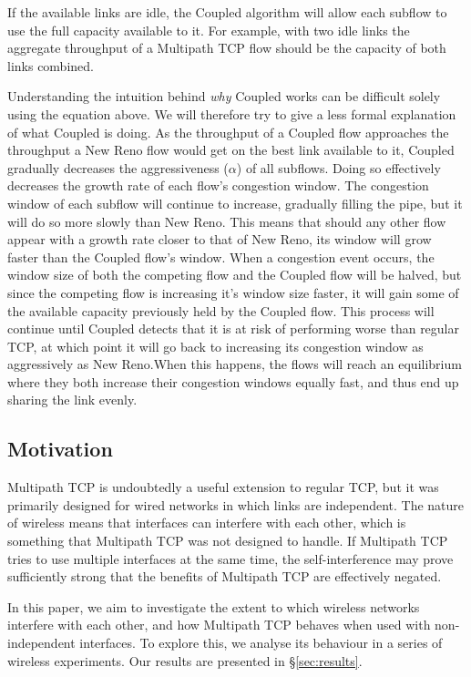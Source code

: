 If the available links are idle, the Coupled algorithm will allow each subflow to
use the full capacity available to it. For example, with two idle links the aggregate
throughput of a Multipath TCP flow should be the capacity of both links combined.

Understanding the intuition behind \textit{why} Coupled works can be difficult
solely using the equation above. We will therefore try to give a less formal
 explanation of what Coupled is doing. As the throughput of a Coupled
flow approaches the throughput a New Reno flow would get on the best link
available to it, Coupled gradually decreases the aggressiveness ($\alpha$)
of all subflows. Doing so effectively decreases the growth rate of each flow's
congestion window. The congestion window of each subflow will continue to increase,
gradually filling the pipe, but it will do so more slowly than New Reno. This means that
should any other flow appear with a growth rate closer to that of New Reno, its
window will grow faster than the Coupled flow's window. When a congestion event
occurs, the window size of both the competing flow and the Coupled
flow will be halved, but since the competing flow is increasing it's window size faster,
it will gain some of the available capacity previously held by the Coupled flow.
This process will continue until Coupled detects that it is at risk of
performing worse than regular TCP, at which point it will go back to increasing its
congestion window as aggressively as New Reno.\@ When this happens, the flows will
reach an equilibrium where they both increase their congestion windows equally
fast, and thus end up sharing the link evenly.

\subsection{Motivation}
\label{sec:bg:motivation}
Multipath TCP is undoubtedly a useful extension to regular TCP, but it was
primarily designed for wired networks in which links are independent.
The nature of wireless means that interfaces can interfere with each
other, which is something that Multipath TCP was not designed to handle.
If Multipath TCP
tries to use multiple interfaces at the same time, the self-interference may
prove sufficiently strong that the benefits of Multipath TCP are effectively
negated.

In this paper, we aim to investigate the extent to which wireless networks
interfere with each other, and how Multipath TCP behaves when used with
non-independent interfaces. To explore this, we analyse its behaviour in a
series of wireless experiments. Our results are presented in
\S\ref{sec:results}.

